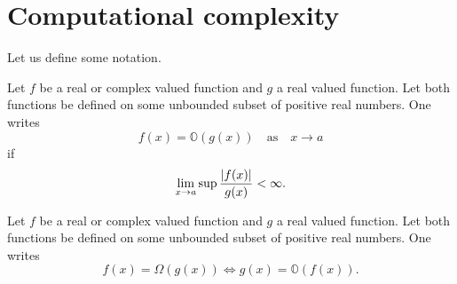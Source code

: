 \section{Computational complexity}
Let us define some notation.
\begin{defn}
   Let $f$ be a real or complex valued function and $g$ a real valued function. Let both functions be defined on some unbounded subset of positive real numbers. One writes
   \begin{equation*}
       f(x) = \mathbb{O}(g(x)) \quad \text{as} \quad x \rightarrow a
   \end{equation*}
   if 
   \begin{equation*}
      \lim_{x \to a} \sup{\frac{\lvert f(x)\rvert}{g(x)}} < \infty.
   \end{equation*}
   \end{defn}
   \begin{defn}
      Let $f$ be a real or complex valued function and $g$ a real valued function. Let both functions be defined on some unbounded subset of positive real numbers. One writes
   \begin{equation*}
       f(x) = \Omega(g(x))
    \Longleftrightarrow
      g(x) = \mathbb{O}(f(x)).
   \end{equation*}
   \end{defn}
   

